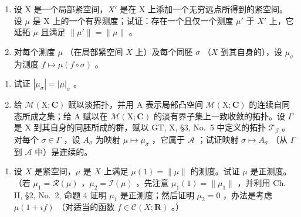 \begin{enumerate}
\def\labelenumi{\arabic{enumi})}
\setcounter{enumi}{15}
\item
  设 X 是一个局部紧空间，\(X'\) 是在 X 上添加一个无穷远点所得到的紧空间。设 \(\mu\) 是 X 上的一个有界测度；试证：存在一个且仅一个测度 \(\mu'\) 于 \(X'\) 上，它延拓 \(\mu\) 且满足 \(\|\mu'\| = \|\mu\|\) 。
\item
  对每个测度 \(\mu\) （在局部紧空间 \(X\) 上）及每个同胚 \(\sigma\) （\(X\) 到其自身的），设 \(\mu_{\sigma}\) 为测度 \(f \mapsto \mu(f \circ \sigma)\) 。
\end{enumerate}

\begin{enumerate}
\def\labelenumi{\alph{enumi})}
\item
  试证 \(|\mu_{\sigma}| = |\mu|_{\sigma}\) 。
\item
  给 \(\mathcal{M}(\mathrm{X};\mathbf{C})\) 赋以淡拓扑，并用 A 表示局部凸空间 \(\mathcal{M}(\mathrm{X};\mathbf{C})\) 的连续自同态所成之集；给 A 赋以在 \(\mathcal{M}(\mathrm{X};\mathbf{C})\) 的淡有界子集上一致收敛的拓扑。设 \(\Gamma\) 是 X 到其自身的同胚所成的群，赋以 GT, X, §3, No.~5 中定义的拓扑 \(\mathcal{T}_{\beta}\) 。对每个 \(\sigma \in \Gamma\) ，设 \(A_{\sigma}\) 为映射 \(\mu \mapsto \mu_{\sigma}\) ，它属于 \(\mathcal{A}\) ；试证映射 \(\sigma \mapsto A_{\sigma}\) （从 \(\Gamma\) 到 \(\mathcal{A}\) 中）是连续的。
\end{enumerate}

\begin{enumerate}
\def\labelenumi{\arabic{enumi})}
\setcounter{enumi}{17}
\tightlist
\item
  设 \(X\) 是紧空间，\(\mu\) 是 \(X\) 上满足 \(\mu(1) = \| \mu \|\) 的测度。试证 \(\mu\) 是正测度。（若 \(\mu_1 = \mathcal{R}(\mu)\) ，\(\mu_2 = \mathcal{I}(\mu)\) ，先注意 \(\mu_1(1) = \| \mu_1 \|\) ，并利用 Ch. II, §2, No.~2, 命题 4 证明 \(\mu_1\) 是正测度；然后证明 \(\mu_2 = 0\) ，办法是考虑 \(\mu(1 + if)\) （对适当的函数 \(f \in \mathcal{C}(X; \mathbf{R})\) 。）
\end{enumerate}

\setcounter{exercisegroup}{2}
\edef\CurrentExerciseGroup{\arabic{exercisegroup}}
